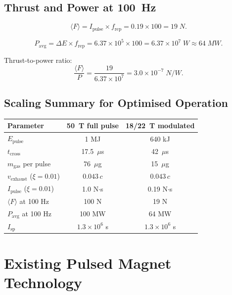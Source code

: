 \documentclass[amsmath,amssymb,aps,prd,superscriptaddress,nofootinbib]{revtex4-2}
\begin{document}
\subsection{Thrust and Power at 100~Hz}

\begin{equation}
\langle F \rangle = I_\text{pulse} \times f_\text{rep}
= 0.19 \times 100 = 19 \; \si{N}.
\end{equation}

\begin{equation}
P_\text{avg} = \Delta E \times f_\text{rep}
= 6.37 \times 10^5 \times 100
= 6.37 \times 10^7 \; \si{W}
\approx 64 \; \si{MW}.
\end{equation}

Thrust-to-power ratio:
\begin{equation}
\frac{\langle F \rangle}{P} = \frac{19}{6.37 \times 10^7}
= 3.0 \times 10^{-7} \; \si{N/W}.
\end{equation}

\subsection{Scaling Summary for Optimised Operation}

\begin{center}
\begin{tabular}{lcc}
\toprule
Parameter & 50~T full pulse & 18/22~T modulated \\
\midrule
$E_\text{pulse}$ & 1 MJ & 640 kJ \\
$t_\text{cross}$ & 17.5~$\mu$s & 42~$\mu$s \\
$m_\text{gas}$ per pulse & 76~$\mu$g & 15~$\mu$g \\
$v_\text{exhaust}$ ($\xi = 0.01$) & $0.043\,c$ & $0.043\,c$ \\
$I_\text{pulse}$ ($\xi = 0.01$) & 1.0 N$\cdot$s & 0.19 N$\cdot$s \\
$\langle F \rangle$ at 100 Hz & 100 N & 19 N \\
$P_\text{avg}$ at 100 Hz & 100 MW & 64 MW \\
$I_\text{sp}$ & $1.3 \times 10^6$ s & $1.3 \times 10^6$ s \\
\bottomrule
\end{tabular}
\end{center}

\section{Existing Pulsed Magnet Technology}\label{sec:technology}
\end{document}
